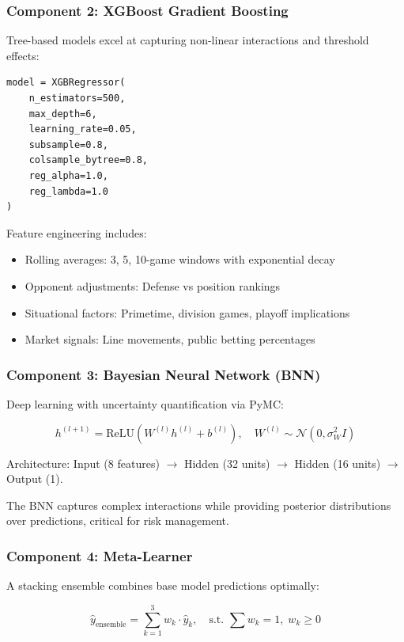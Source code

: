 \subsubsection{Component 2: XGBoost Gradient Boosting}

Tree-based models excel at capturing non-linear interactions and threshold effects:

\begin{verbatim}
model = XGBRegressor(
    n_estimators=500,
    max_depth=6,
    learning_rate=0.05,
    subsample=0.8,
    colsample_bytree=0.8,
    reg_alpha=1.0,
    reg_lambda=1.0
)
\end{verbatim}

Feature engineering includes:
\begin{itemize}
  \item Rolling averages: 3, 5, 10-game windows with exponential decay
  \item Opponent adjustments: Defense vs position rankings
  \item Situational factors: Primetime, division games, playoff implications
  \item Market signals: Line movements, public betting percentages
\end{itemize}

\subsubsection{Component 3: Bayesian Neural Network (BNN)}

Deep learning with uncertainty quantification via PyMC:

\begin{equation}
h^{(l+1)} = \text{ReLU}(W^{(l)} h^{(l)} + b^{(l)}), \quad
W^{(l)} \sim \mathcal{N}(0, \sigma_W^2 I)
\end{equation}

Architecture: Input (8 features) $\to$ Hidden (32 units) $\to$ Hidden (16 units) $\to$ Output (1).

The BNN captures complex interactions while providing posterior distributions over predictions, critical for risk management.

\subsubsection{Component 4: Meta-Learner}

A stacking ensemble combines base model predictions optimally:

\begin{equation}
\hat{y}_{\text{ensemble}} = \sum_{k=1}^3 w_k \cdot \hat{y}_k, \quad
\text{s.t. } \sum w_k = 1, \; w_k \geq 0
\end{equation}

